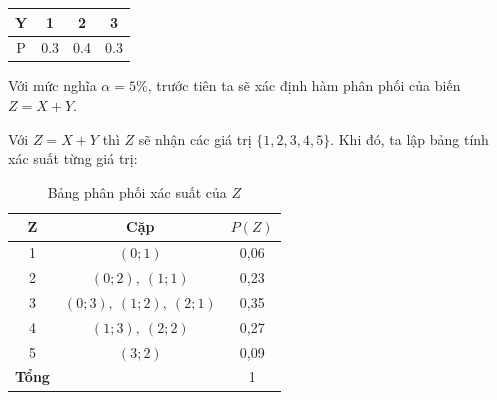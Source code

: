\begin{table}[h!]
\centering
    \begin{tabular}{|c|ccc|}
    \hline
        Y & 1 & 2 & 3  \\ \hline
        P & 0.3&0.4&0.3\\
        \hline
    \end{tabular}
    \label{tab:Y_dist}
\end{table}
Với mức nghĩa $\alpha=5\%$, trước tiên ta sẽ xác định hàm phân phối của biến $Z=X+Y$.

Với $Z=X+Y$ thì $Z$ sẽ nhận các giá trị $\{1,2,3,4,5\}$. Khi đó, ta lập bảng tính xác suất từng giá trị:

\begin{table}[h!]
\centering
\begin{tabular}{|c|c|c|}
\hline
\textbf{Z} & \textbf{Cặp} & $P(Z)$ \\ \hline
1 & $(0;1)$ & 0,06 \\ \hline
2 & $(0;2),\ (1;1)$ & 0,23 \\ \hline
3 & $(0;3),\ (1;2),\ (2;1)$ & 0,35 \\ \hline
4 & $(1;3),\ (2;2)$ & 0,27 \\ \hline
5 & $(3;2)$ & 0,09 \\ \hline
\textbf{Tổng} &  & 1 \\ \hline
\end{tabular}
\caption{Bảng phân phối xác suất của $Z$}
\label{tab:distZ}
\end{table}

